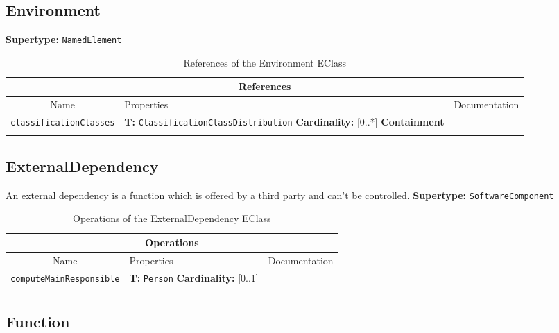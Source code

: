 \documentclass{article}
\begin{document}
\subsection[Environment]{Environment}
\label{e4smEnvironment}

\textbf{Supertype: }\texttt{NamedElement}
\begin{table}[H]
\footnotesize
\begin{tabularx}{\textwidth}{|c| p{4 cm} | X |}
\hline
\multicolumn{3}{|c|}{\textbf{References}} \\
\hline
Name & Properties & Documentation \\ \hline \hline
\texttt{classificationClasses}
 & 
\textbf{T:} \texttt{ClassificationClassDistribution}
\newline
\textbf{Cardinality:} [0..*]
\newline
\textbf{Containment}
 & \\ \hline
\caption{References of the Environment EClass}
\end{tabularx}
\label{e4smEnvironmentref}
\end{table}
\subsection[ExternalDependency]{ExternalDependency}
\label{e4smExternalDependency}

An external dependency is a function which is offered by a third party and can't be controlled.
\textbf{Supertype: }\texttt{SoftwareComponent}
\begin{table}[H]
\footnotesize
\begin{tabularx}{\textwidth}{|c| p{4 cm} | X |}
\hline
\multicolumn{3}{|c|}{\textbf{Operations}} \\
\hline
Name & Properties & Documentation \\ \hline \hline
\texttt{computeMainResponsible}
 & 
\textbf{T:} \texttt{Person}
\newline
\textbf{Cardinality:} [0..1]
 & \\ \hline
\caption{Operations of the ExternalDependency EClass}
\end{tabularx}
\label{e4smExternalDependencyop}
\end{table}
\subsection[Function]{Function}
\label{e4smFunction}
\end{document}
